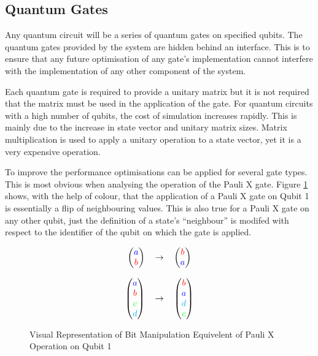 \documentclass[authoryearcitations]{UoYCSproject}
\begin{document}
\subsection{Quantum Gates}
\label{sec:quantumgates}
Any quantum circuit will be a series of quantum gates on specified qubits.
The quantum gates provided by the system are hidden behind an interface.
This is to ensure that any future optimisation of any gate's implementation cannot interfere with the implementation of any other component of the system.

Each quantum gate is required to provide a unitary matrix but it is not required that the matrix must be used in the application of the gate.
For quantum circuits with a high number of qubits, the cost of simulation increases rapidly.
This is mainly due to the increase in state vector and unitary matrix sizes.
Matrix multiplication is used to apply a unitary operation to a state vector, yet it is a very expensive operation.

To improve the performance optimisations can be applied for several gate types.
This is most obvious when analysing the operation of the Pauli X gate.
Figure \ref{eq:paulixcheaptrickvisual} shows, with the help of colour, that the application of a Pauli X gate on Qubit 1 is essentially a flip of neighbouring values.
This is also true for a Pauli X gate on any other qubit, just the definition of a state's ``neighbour'' is modifed with respect to the identifier of the qubit on which the gate is applied.

\begin{figure}
\[
\begin{tabular}{ r c l }
  \(\begin {pmatrix}
    \textcolor{blue}{a}\\
    \textcolor{red}{b}
  \end{pmatrix}\) 
& 
  \(\rightarrow\) 
& 
  \(\begin {pmatrix}
    \textcolor{red}{b}\\
    \textcolor{blue}{a}
  \end{pmatrix}\) \\

\\

  \(\begin {pmatrix}
    \textcolor{blue}{a}\\
    \textcolor{red}{b}\\
    \textcolor{green}{c}\\
    \textcolor{cyan}{d}
  \end{pmatrix}\)
  & \(\rightarrow\)
  & \(\begin {pmatrix}
    \textcolor{red}{b}\\
    \textcolor{blue}{a}\\
    \textcolor{cyan}{d}\\
    \textcolor{green}{c}
  \end{pmatrix}\) \\
\end{tabular}
\]
\label{eq:paulixcheaptrickvisual}
\caption{Visual Representation of Bit Manipulation Equivelent of Pauli X Operation on Qubit 1}
\end{figure}
\end{document}
